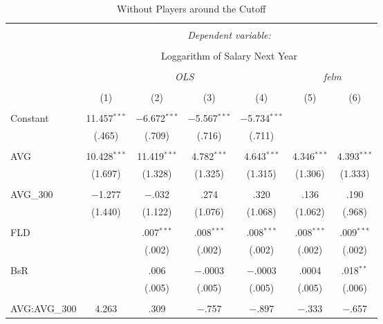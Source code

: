 
\begin{table}[H] \centering
  \caption{Without Players around the Cutoff}
  \label{AVG300_E}
\fontsize{5pt}{4pt}\selectfont
\begin{tabular}{@{\extracolsep{-15pt}}lcccccc}
\\[-1.8ex]\hline
\hline \\[-1.8ex]
 & \multicolumn{6}{c}{\textit{Dependent variable:}} \\
\cline{2-7}
\\[-1.8ex] & \multicolumn{6}{c}{Loggarithm of Salary Next Year} \\
\\[-1.8ex] & \multicolumn{4}{c}{\textit{OLS}} & \multicolumn{2}{c}{\textit{felm}} \\
\\[-1.8ex] & (1) & (2) & (3) & (4) & (5) & (6)\\
\hline \\[-1.8ex]
 Constant & 11.457$^{***}$ & $-$6.672$^{***}$ & $-$5.567$^{***}$ & $-$5.734$^{***}$ &  &  \\
  & (.465) & (.709) & (.716) & (.711) &  &  \\
  & & & & & & \\
 AVG & 10.428$^{***}$ & 11.419$^{***}$ & 4.782$^{***}$ & 4.643$^{***}$ & 4.346$^{***}$ & 4.393$^{***}$ \\
  & (1.697) & (1.328) & (1.325) & (1.315) & (1.306) & (1.333) \\
  & & & & & & \\
 AVG\_300 & $-$1.277 & $-$.032 & .274 & .320 & .136 & .190 \\
  & (1.440) & (1.122) & (1.076) & (1.068) & (1.062) & (.968) \\
  & & & & & & \\
 FLD &  & .007$^{***}$ & .008$^{***}$ & .008$^{***}$ & .008$^{***}$ & .009$^{***}$ \\
  &  & (.002) & (.002) & (.002) & (.002) & (.002) \\
  & & & & & & \\
 BsR &  & .006 & $-$.0003 & $-$.0003 & .0004 & .018$^{**}$ \\
  &  & (.005) & (.005) & (.005) & (.005) & (.006) \\
  & & & & & & \\
 AVG:AVG\_300 & 4.263 & .309 & $-$.757 & $-$.897 & $-$.333 & $-$.657 \\

\end{tabular}
\end{table}
